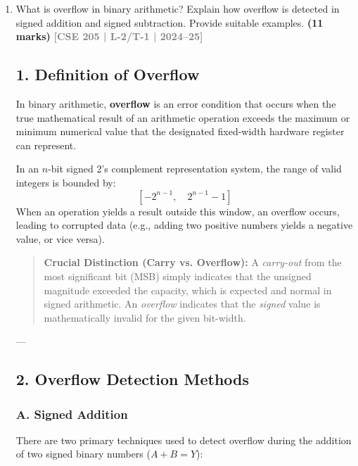 \documentclass[12pt,a3paper]{article}
\newcommand{\yr}[1]{\hfill\textcolor{gray}{\small\textbf{[#1]}}}
\newcommand{\mk}[1]{\textcolor{orange!70!black}{\small\textbf{(#1 marks)}}}
\begin{document}
\begin{enumerate}

\item What is overflow in binary arithmetic? Explain how overflow is detected in signed addition and signed subtraction. Provide suitable examples.
\mk{11} \yr{CSE 205 | L-2/T-1 | 2024--25}

\begin{tcolorbox}[enhanced,breakable,ansbox,colback=cD!4,colframe=cD,boxrule=0.8pt,arc=5pt,title={\textbf{Answer}},fonttitle=\bfseries\color{white},colbacktitle=cD]

\subsection*{1. Definition of Overflow}
In binary arithmetic, \textbf{overflow} is an error condition that occurs when the true mathematical result of an arithmetic operation exceeds the maximum or minimum numerical value that the designated fixed-width hardware register can represent. 

In an $n$-bit signed 2's complement representation system, the range of valid integers is bounded by:
$$[-2^{n-1}, \quad 2^{n-1} - 1]$$
When an operation yields a result outside this window, an overflow occurs, leading to corrupted data (e.g., adding two positive numbers yields a negative value, or vice versa).

\begin{quote}
    \textbf{Crucial Distinction (Carry vs. Overflow):} A \textit{carry-out} from the most significant bit (MSB) simply indicates that the unsigned magnitude exceeded the capacity, which is expected and normal in signed arithmetic. An \textit{overflow} indicates that the \textit{signed} value is mathematically invalid for the given bit-width.
\end{quote}

---

\subsection*{2. Overflow Detection Methods}

\subsubsection*{A. Signed Addition}
There are two primary techniques used to detect overflow during the addition of two signed binary numbers ($A + B = Y$):


\end{tcolorbox}
\end{enumerate}
\end{document}
